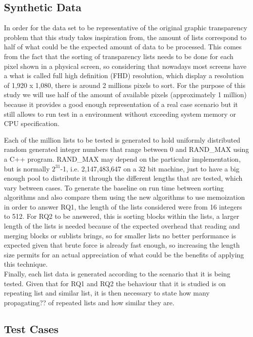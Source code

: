 \documentclass[a4paper,12pt]{article}
\begin{document}
\subsection{Synthetic Data}

In order for the data set to be representative of the original graphic transparency problem that this study takes inspiration from, the amount of lists correspond to half of what could be the expected amount of data to be processed. This comes from the fact that the sorting of transparency lists needs to be done for each pixel shown in a physical screen, so considering that nowadays most screens have a what is called full high definition (FHD) resolution, which display a resolution of 1,920 x 1,080, there is around 2 millions pixels to sort. For the purpose of this study  we will use half of the amount of available pixels (approximately 1 million) because it provides a good enough representation of a real case scenario but it still allows to run test in a environment without exceeding system memory or CPU specification.

Each of the million lists to be tested is generated to hold uniformly distributed random generated integer numbers that range between 0 and RAND\_MAX using a C++ program. RAND\_MAX may depend on the particular implementation, but is normally  $2^{31}$-1, i.e. 2,147,483,647 on a 32 bit machine, just  to have a big enough pool to distribute it through the different lengths that are tested, which vary between cases. To generate the baseline on run time between sorting algorithms and also compare them using the new algorithms to use memoization in order to answer RQ1, the length of the lists considered were from 16 integers to 512. For RQ2 to be answered, this is sorting blocks within the lists, a larger length of the lists is needed because of the expected overhead that reading and merging blocks or sublists brings, so for smaller lists no better performance is expected given that brute force is already fast enough, so increasing the length size permits for an actual appreciation of what could be the benefits of applying this technique.\\

Finally, each list data is generated according to the scenario that it is being tested. Given that for RQ1 and RQ2 the behaviour that it is studied is on repeating list and similar list, it is then necessary to state how many propagating?? of repeated lists and how similar they are. 

\subsection{Test Cases}
\end{document}
